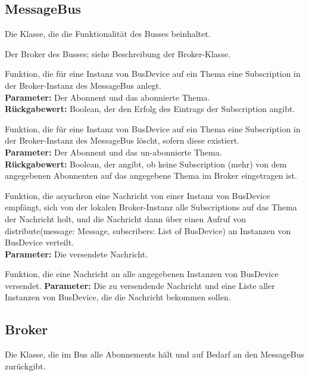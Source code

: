 \documentclass[entwurf.tex]{subfiles}
\begin{document}
	\subsection{MessageBus}
	\label{Class:MessageBus}
		Die Klasse, die die Funktionalität des Busses beinhaltet.
		\begin{description}
				Der Broker des Busses; siehe Beschreibung der Broker-Klasse. 
				
			Funktion, die für eine Instanz von BusDevice auf ein Thema eine Subscription in der Broker-Instanz des MessageBus anlegt. \\
			\textbf{Parameter:} Der Abonnent und das abonnierte Thema. \\
			\textbf{Rückgabewert:} Boolean, der den Erfolg des Eintrags der Subscription angibt. 
			
			Funktion, die für eine Instanz von BusDevice auf ein Thema eine Subscription in der Broker-Instanz des MessageBus löscht, sofern diese existiert. \\
			\textbf{Parameter:} Der Abonnent und das un-abonnierte Thema. \\
			\textbf{Rückgabewert:} Boolean, der angibt, ob keine Subscription (mehr) von dem angegebenen Abonnenten auf das angegebene Thema im Broker eingetragen ist. 
			
			Funktion, die asynchron eine Nachricht von einer Instanz von BusDevice empfängt, sich von der lokalen Broker-Instanz alle Subscriptions auf das Thema der Nachricht holt, und die Nachricht dann über einen Aufruf von distribute(message: Message, subscribers: List of BusDevice) an Instanzen von BusDevice verteilt. \\
			\textbf{Parameter:} Die versendete Nachricht.
			
			Funktion, die eine Nachricht an alle angegebenen Instanzen von BusDevice versendet.
			\textbf{Parameter:} Die zu versendende Nachricht und eine Liste aller Instanzen von BusDevice, die die Nachricht bekommen sollen. 
			\end{description}
			
		\subsection{Broker}
		\label{Class:Broker}
		Die Klasse, die im Bus alle Abonnements hält und auf Bedarf an den MessageBus zurückgibt.\\
		
\end{document}
